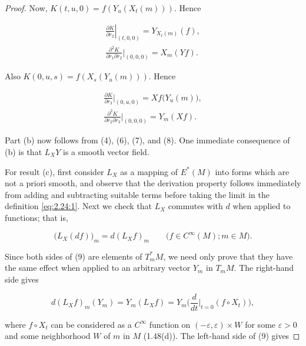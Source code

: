 \begin{proof}
Now,  $ K(t,u,0) = f(Y_u(X_t(m))) $. Hence

\begin{equation}
\tag{7}\label{eq:2.25:7}\begin{gathered}
\left.\frac{\partial K}{\partial r_{2}}\right|_{(t,0,0)}=Y_{X_{t}(m)}(f),\\[4pt]
\frac{\partial^{2}K}{\partial r_{1}\partial r_{2}}\bigg|_{(0,0,0)}=X_{m}(Y f).
\end{gathered}
\end{equation}

Also  $ K(0,u,s) = f(X_s(Y_u(m))) $. Hence

\begin{equation}
\tag{8}\label{eq:2.25:8}\begin{gathered}
\frac{\partial K}{\partial r_{3}}\bigg|_{(0,u,0)}=X f\big(Y_{u}(m)\big),\\[4pt]
\frac{\partial^{2}K}{\partial r_{2}\partial r_{3}}\bigg|_{(0,0,0)}=Y_{m}(X f).
\end{gathered}
\end{equation}

Part (b) now follows from (4), (6), (7), and (8). One immediate consequence of (b) is that $L_{X}Y$ is a smooth vector field.

For result (c), first consider $L_{X}$ as a mapping of $E^{*}(M)$ into forms which are not a priori smooth, and observe that the derivation property follows immediately from adding and subtracting suitable terms before taking the limit in the definition \eqref{eq:2.24:1}. Next we check that $L_{X}$ commutes with $d$ when applied to functions; that is,

\begin{equation}
\tag{9}\label{eq:2.25:9}
\big(L_{X}(d f)\big)_{m}=d(L_{X}f)_{m}\qquad\big(f\in C^{\infty}(M);m\in M\big).
\end{equation}

Since both sides of (9) are elements of  $ T_{m}^{*} M $, we need only prove that they have the same effect when applied to an arbitrary vector  $ Y_{m} $ in  $ T_{m} M $. The right-hand side gives

\begin{equation}
\tag{10}\label{eq:2.25:10}
d(L_{X}f)_{m}(Y_{m})=Y_{m}(L_{X}f)=Y_{m}\biggl(\frac{d}{d t}\bigg\vert_{t=0}(f\circ X_{t})\biggr),
\end{equation}

where $f\circ X_{t}$ can be considered as a $C^{\infty}$ function on $(-\varepsilon,\varepsilon)\times W$ for some $\varepsilon>0$ and some neighborhood $W$ of $m$ in $M$ (1.48(d)). The left-hand side of (9) gives


\end{proof}
